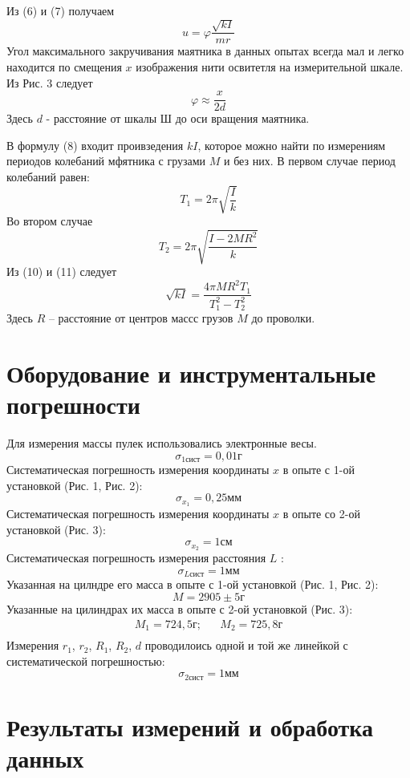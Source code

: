 \documentclass[a4paper,12pt]{article} %
\begin{document}
Из (6) и (7) получаем
\begin{equation}
u = \varphi\frac{\sqrt{kI}}{mr}
\end{equation}
Угол максимального закручивания маятника в данных опытах всегда мал и легко находится по смещения $x$ изображения нити освитетля на измерительной шкале. Из Рис. 3 следует
\begin{equation}
\varphi\approx\frac{x}{2d}
\end{equation}
Здесь $d$ - расстояние от шкалы Ш до оси вращения маятника.

В формулу (8) входит проивзедения $kI$, которое можно найти по измерениям периодов колебаний мфятника с грузами $M$ и без них. В первом случае период колебаний равен:
\begin{equation}
T_1 = 2\pi\sqrt{\frac{I}{k}}
\end{equation}
Во втором случае
\begin{equation}
T_2 = 2\pi\sqrt{\frac{I-2MR^2}{k}}
\end{equation}
Из (10) и (11) следует
\begin{equation}
\sqrt{kI}=\frac{4\pi MR^2T_1}{T_1^2-T_2^2}
\end{equation}
Здесь $R$ -- расстояние от центров массс грузов $M$ до проволки.
\newpage
\section{Оборудование и инструментальные погрешности}
Для измерения массы пулек использовались электронные весы. 
\[\sigma_{1\text{сист}} = 0,01\text{г}\]
Систематическая погрешность измерения координаты $x$ в опыте с 1-ой установкой (Рис. 1, Рис. 2):
\[\sigma_{x_1} = 0,25\text{мм}\]
Систематическая погрешность измерения координаты $x$ в опыте со 2-ой установкой (Рис. 3):
\[\sigma_{x_2} = 1\text{см}\]
Систематическая погрешность измерения расстояния $L$ :
\[\sigma_{L\text{сист}} = 1\text{мм}\]
Указанная на цилндре его масса в опыте с 1-ой установкой (Рис. 1, Рис. 2):
\[M = 2905\pm5\text{г}\]
Указанные на цилиндрах их масса в опыте с 2-ой установкой (Рис. 3):
\[
\begin{aligned}
M_1 = 724,5\text{г}; & & M_2 = 725,8\text{г}\\
\end{aligned}
\]
Измерения $r_1$, $r_2$, $R_1$, $R_2$, $d$ проводилоись одной и той же линейкой с систематической погрешностью:
\[\sigma_{2\text{сист}} = 1 \text{мм}\]
\section{Результаты измерений и обработка данных}
\end{document}
